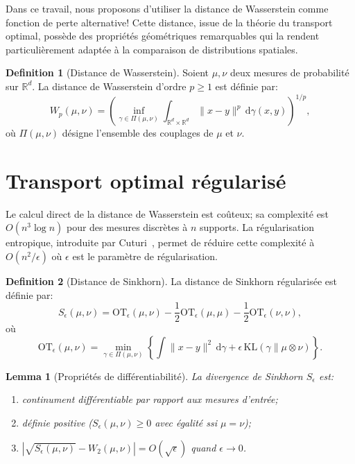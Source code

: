 \documentclass[11pt,a4paper]{article}
\newtheorem{lemma}[theorem]{Lemma}
\theoremstyle{definition}
\newtheorem{definition}{Definition}[section]
\begin{document}
Dans ce travail, nous proposons d'utiliser la distance de Wasserstein
comme fonction de perte alternative! Cette distance, issue de la
th\'eorie du transport optimal, poss\`ede des propri\'et\'es
g\'eom\'etriques remarquables qui la rendent particuli\`erement
adapt\'ee \`a la comparaison de distributions spatiales.

\begin{definition}[Distance de Wasserstein]
Soient $\mu, \nu$ deux mesures de probabilit\'e sur $\mathbb{R}^d$.
La distance de Wasserstein d'ordre $p \geq 1$ est d\'efinie par:
\begin{equation}\label{eq:wasserstein}
  W_p(\mu, \nu) = \left( \inf_{\gamma \in \Pi(\mu, \nu)}
    \int_{\mathbb{R}^d \times \mathbb{R}^d} \|x - y\|^p \,
    \mathrm{d}\gamma(x, y) \right)^{1/p},
\end{equation}
o\`u $\Pi(\mu, \nu)$ d\'esigne l'ensemble des couplages de $\mu$ et $\nu$.
\end{definition}


\section{Transport optimal r\'egularis\'e}

Le calcul direct de la distance de Wasserstein est co\^uteux;
sa complexit\'e est $O(n^3 \log n)$ pour des mesures discr\`etes
\`a $n$ supports. La r\'egularisation entropique, introduite par
Cuturi~\cite{cuturi2013sinkhorn}, permet de r\'eduire cette
complexit\'e \`a $O(n^2 / \epsilon)$ o\`u $\epsilon$ est le
param\`etre de r\'egularisation.

\begin{definition}[Distance de Sinkhorn]
La distance de Sinkhorn r\'egularis\'ee est d\'efinie par:
\begin{equation}\label{eq:sinkhorn}
  S_\epsilon(\mu, \nu) = \text{OT}_\epsilon(\mu, \nu)
    - \frac{1}{2} \text{OT}_\epsilon(\mu, \mu)
    - \frac{1}{2} \text{OT}_\epsilon(\nu, \nu),
\end{equation}
o\`u
\begin{equation}\label{eq:ot-reg}
  \text{OT}_\epsilon(\mu, \nu) = \min_{\gamma \in \Pi(\mu, \nu)}
    \left\{ \int \|x-y\|^2 \, \mathrm{d}\gamma + \epsilon \,
    \text{KL}(\gamma \| \mu \otimes \nu) \right\}.
\end{equation}
\end{definition}

\begin{lemma}[Propri\'et\'es de diff\'erentiabilit\'e]
La divergence de Sinkhorn $S_\epsilon$ est:
\begin{enumerate}
  \item continument diff\'erentiable par rapport aux mesures d'entr\'ee;
  \item d\'efinie positive ($S_\epsilon(\mu, \nu) \geq 0$ avec \'egalit\'e
    ssi $\mu = \nu$);
  \item $|\sqrt{S_\epsilon(\mu, \nu)} - W_2(\mu, \nu)| = O(\sqrt{\epsilon})$
    quand $\epsilon \to 0$.
\end{enumerate}
\end{lemma}
\end{document}
